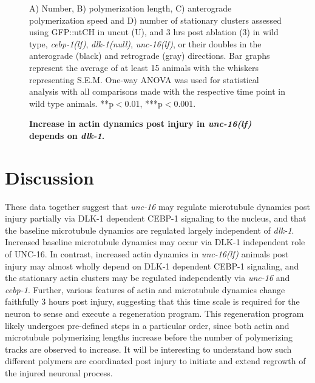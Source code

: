 \begin{appendices}
\begin{figure}[H]
\begin{minipage}[t]{0.6\textwidth}
\begin{subfigure}{1\textwidth}
		\end{subfigure}
	\end{minipage}
	\begin{minipage}[t]{0.38\textwidth}
		\vspace{0pt}
		\caption[Increase in actin dynamics post injury in \textit{unc-16(lf)} depends on \textit{dlk-1}.]{\textbf{Increase in actin dynamics post injury in \textit{unc-16(lf)} depends on \textit{dlk-1}.}} \raggedright \small  A) Number, B) polymerization length, C) anterograde polymerization speed and D) number of stationary clusters assessed using GFP::utCH in uncut (U), and 3 hrs post ablation (3) in wild type, \textit{cebp-1(lf)}, \textit{dlk-1(null)}, \textit{unc-16(lf)}, or their doubles in the anterograde (black) and retrograde (gray) directions. Bar graphs represent the average of at least 15 animals with the whiskers representing S.E.M. One-way ANOVA was used for statistical analysis with all comparisons made with the respective time point in wild type animals. **p$<$0.01, ***p$<$0.001.
		\label{fig:Actdynmut}
	\end{minipage}
	\end{figure}
	
	\section{Discussion}
	
	These data together suggest that \textit{unc-16} may regulate microtubule dynamics post injury partially via DLK-1 dependent CEBP-1 signaling to the nucleus, and that the baseline microtubule dynamics are regulated largely independent of \textit{dlk-1}. Increased baseline microtubule dynamics may occur via DLK-1 independent role of UNC-16. In contrast, increased actin dynamics in \textit{unc-16(lf)} animals post injury may almost wholly depend on DLK-1 dependent CEBP-1 signaling, and the stationary actin clusters may be regulated independently via \textit{unc-16} and \textit{cebp-1}. Further, various features of actin and microtubule dynamics change faithfully 3 hours post injury, suggesting that this time scale is required for the neuron to sense and execute a regeneration program. This regeneration program likely undergoes pre-defined steps in a particular order, since both actin and microtubule polymerizing lengths increase before the number of polymerizing tracks are observed to increase. It will be interesting to understand how such different polymers are coordinated post injury to initiate and extend regrowth of the injured neuronal process.
	

\end{appendices}
